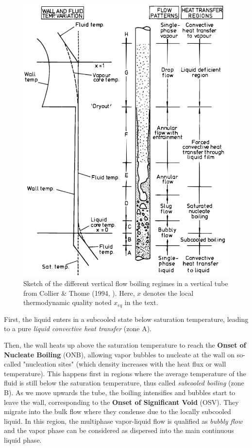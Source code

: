 \begin{figure}[!h]
\centering
\includegraphics[width=0.6\linewidth]{img/intro/boiling_collier.png}
\caption{Sketch of the different vertical flow boiling regimes in a vertical tube from Collier \& Thome (1994, \cite{collier_convective_1994}). Here, $x$ denotes the local thermodynamic quality noted $x_{eq}$ in the text. }
\label{fig:boiling_collier}
\end{figure}


\npar


First, the liquid enters in a subcooled state \ie below saturation temperature, leading to a pure \textit{liquid convective heat transfer} (zone A).

\npar

Then, the wall heats up above the saturation temperature to reach the \textbf{Onset of Nucleate Boiling} (ONB), allowing vapor bubbles to nucleate at the wall on so-called "nucleation sites" (which density increases with the heat flux or wall temperature). This happens first in regions where the average temperature of the fluid is still below the saturation temperature, thus called \textit{subcooled boiling} (zone B). As we move upwards the tube, the boiling intensifies and bubbles start to leave the wall, corresponding to the \textbf{Onset of Significant Void} (OSV). They migrate into the bulk flow where they condense due to the locally subcooled liquid. In this region, the multiphase vapor-liquid flow is qualified as \textit{bubbly flow} and the vapor phase can be considered as dispersed into the main continuous liquid phase.

